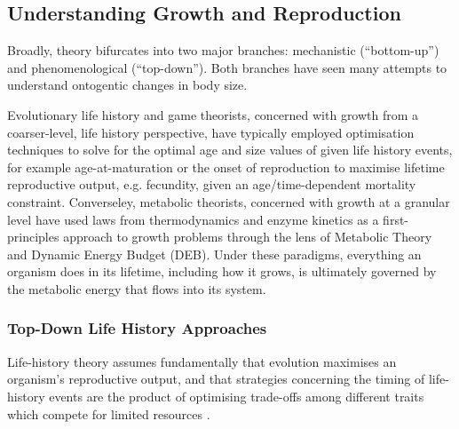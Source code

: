 \documentclass[a4paper]{article} %
\begin{document}
        \subsection{Understanding Growth and Reproduction}
        Broadly, theory bifurcates into two major branches: mechanistic (``bottom-up'') and phenomenological (``top-down''). Both branches have seen many attempts to understand ontogentic changes in body size.  
        
        Evolutionary life history and game theorists, concerned with growth from a coarser-level, life history perspective, have typically employed optimisation techniques to solve for the optimal age and size values of given life history events, for example age-at-maturation or the onset of reproduction to maximise lifetime reproductive output, e.g. fecundity, given an age/time-dependent mortality constraint. Converseley, metabolic theorists, concerned with growth at a granular level have used laws from thermodynamics and enzyme kinetics as a first-principles approach to growth problems through the lens of Metabolic Theory and Dynamic Energy Budget (DEB). Under these paradigms, everything an organism does in its lifetime, including how it grows, is ultimately governed by the metabolic energy that flows into its system. 

        
        \subsubsection{Top-Down Life History Approaches}
        Life-history theory assumes fundamentally that evolution maximises an organism's reproductive output, and that strategies concerning the timing of life-history events are the product of optimising trade-offs among different traits which compete for limited resources \autocite{Day1997, Stearns1989, stearns1992evolution}.      
\end{document}
